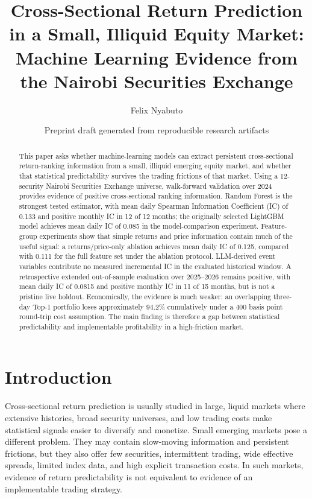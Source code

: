 \documentclass[11pt,a4paper]{article}
\title{Cross-Sectional Return Prediction in a Small, Illiquid Equity Market:\\
Machine Learning Evidence from the Nairobi Securities Exchange}
\author{Felix Nyabuto}
\date{Preprint draft generated from reproducible research artifacts}
\begin{document}
\maketitle

\begin{abstract}
This paper asks whether machine-learning models can extract persistent
cross-sectional return-ranking information from a small, illiquid emerging
equity market, and whether that statistical predictability survives the
trading frictions of that market.  Using a 12-security Nairobi Securities
Exchange universe, walk-forward validation over 2024 provides evidence of
positive cross-sectional ranking information.  Random Forest is the strongest
tested estimator, with mean daily Spearman Information Coefficient (IC) of
0.133 and positive monthly IC in 12 of 12 months; the originally selected
LightGBM model achieves mean daily IC of 0.085 in the model-comparison
experiment.  Feature-group experiments show that simple returns and price
information contain much of the useful signal: a returns/price-only ablation
achieves mean daily IC of 0.125, compared with 0.111 for the full feature set
under the ablation protocol.  LLM-derived event variables contribute no
measured incremental IC in the evaluated historical window.  A retrospective
extended out-of-sample evaluation over 2025--2026 remains positive, with mean
daily IC of 0.0815 and positive monthly IC in 11 of 15 months, but is not a
pristine live holdout.  Economically, the evidence is much weaker: an
overlapping three-day Top-1 portfolio loses approximately 94.2\% cumulatively
under a 400 basis point round-trip cost assumption.  The main finding is
therefore a gap between statistical predictability and implementable
profitability in a high-friction market.
\end{abstract}

\section{Introduction}

Cross-sectional return prediction is usually studied in large, liquid markets
where extensive histories, broad security universes, and low trading costs make
statistical signals easier to diversify and monetize.  Small emerging markets
pose a different problem.  They may contain slow-moving information and
persistent frictions, but they also offer few securities, intermittent trading,
wide effective spreads, limited index data, and high explicit transaction
costs.  In such markets, evidence of return predictability is not equivalent
to evidence of an implementable trading strategy.
\end{document}
